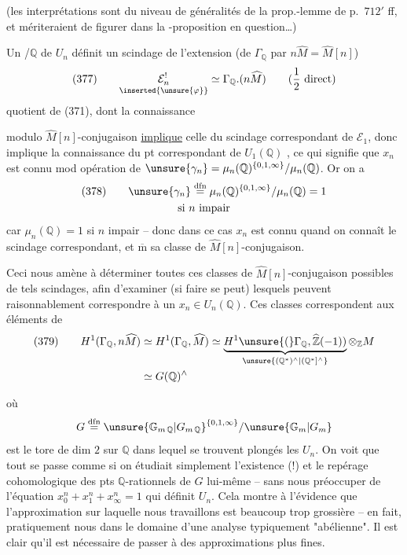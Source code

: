 (les interprétations sont du niveau de généralités de la prop.-lemme de p.~$712'$ ff, et mériteraient de figurer dans la -proposition en question\ldots)

Un   /$\mathbb Q$ de $U_n$ définit un scindage de l'extension (de $\Gamma_{\mathbb Q}$ par $n\widehat M=\widehat M[n]$)
\[
\text{(377)}\qquad \underset{\inserted{\unsure{\varphi}}}{\mathcal E_n^{!}}\simeq\Gamma_{\mathbb Q}.(n\widehat M)
\qquad\text{($\frac12$ direct)}
\]
quotient de (371), dont la connaissance

modulo  $\widehat M[n]$-conjugaison \uline{implique} celle
du scindage correspondant de $\mathcal E_1$, donc
implique la connaissance du pt correspondant 
de $U_1(\mathbb Q)$ , ce qui signifie
que $x_n$ est connu mod opération de
$\unsure{\gamma_n}=\mu_n(\mathbb Q)^{\{0,1,\infty\}}/\mu_n(\mathbb Q)$.
Or on a
\[
\begin{gathered}
\text{(378)}\qquad
\unsure{\gamma_n}\overset{\mathrm{dfn}}=
\mu_n(\mathbb Q)^{\{0,1,\infty\}}/\mu_n(\mathbb Q)=1\\
\text{si }n\text{ impair}
\end{gathered}
\]
car $\mu_n(\mathbb Q)=1$ si $n$ impair -- donc dans
ce cas $x_n$ est connu quand on connaît
le scindage correspondant, et $\overline{\mathrm m}$
 sa classe de $\widehat M[n]$-conjugaison.

Ceci nous amène à déterminer toutes ces
classes de $\widehat M[n]$-conjugaison possibles de
tels scindages, afin d'examiner (si faire se
peut) lesquels peuvent raisonnablement
correspondre à un $x_n\in U_n(\mathbb Q)$. Ces classes
correspondent aux éléments de
\[
\begin{aligned}
\text{(379)}\qquad
H^1(\Gamma_{\mathbb Q},n\widehat M)
&\simeq H^1(\Gamma_{\mathbb Q},\widehat M)
\simeq
\underbrace{H^1\unsure{(}\Gamma_{\mathbb Q},\widehat{\mathbb Z}(-1))}
_{\unsure{(\mathbb Q^*)^\wedge|(\mathbb Q^*]^\wedge}}
\otimes_{\mathbb Z}M\\
&\simeq G(\mathbb Q)^\wedge
\end{aligned}
\]

où
\[
G\overset{\mathrm{dfn}}=
\unsure{\mathbb G_{m\,\mathbb Q}|G_{m\,\mathbb Q}}^{\{0,1,\infty\}}
/\unsure{\mathbb G_m|G_m}
\]
est le tore de dim $2$ sur $\mathbb Q$ dans lequel
se trouvent plongés les $U_n$. On voit que
tout se passe comme si on étudiait
simplement l'existence (!) et le repérage
cohomologique des pts $\mathbb Q$-rationnels de
$G$ lui-même -- sans nous préoccuper
de l'équation $x_0^n+x_1^n+x_\infty^n=1$ qui définit
$U_n$. Cela montre à l'évidence que
l'approximation sur laquelle nous travaillons
est beaucoup trop grossière -- en fait,
pratiquement nous  dans le
domaine d'une analyse typiquement
"abélienne". Il est clair qu'il est
nécessaire de passer à des approximations
plus fines.

